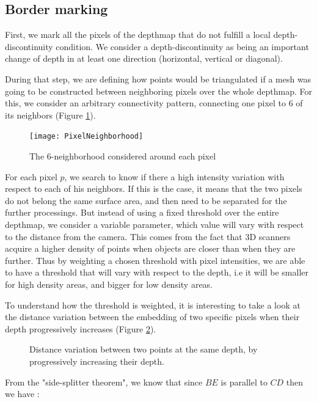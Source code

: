 \documentclass[11pt,fleqn]{book} %
\begin{document}
\subsection{Border marking}
First, we mark all the pixels of the depthmap that do not fulfill a local depth-discontinuity condition. We consider a depth-discontinuity as being an important change of depth in at least one direction (horizontal, vertical or diagonal).

During that step, we are defining how points would be triangulated if a mesh was going to be constructed between neighboring pixels over the whole depthmap. 
For this, we consider an arbitrary connectivity pattern, connecting one pixel to 6 of its neighbors (Figure \ref{fig:pixel_neighborhood}). 

\begin{figure}[ht]
\centering\texttt{[image: PixelNeighborhood]}
\caption{The 6-neighborhood considered around each pixel}
\label{fig:pixel_neighborhood}
\end{figure}

For each pixel $p$, we search to know if there a high intensity variation with respect to each of his neighbors. If this is the case, it means that the two pixels do not belong the same surface area, and then need to be separated for the further processings.
But instead of using a fixed threshold over the entire depthmap, we consider a variable parameter, which value will vary with respect to the distance from the camera.
This comes from the fact that 3D scanners acquire a higher density of points when objects are closer than when they are further. 
Thus by weighting a chosen threshold with pixel intensities, we are able to have a threshold that will vary with respect to the depth, i.e it will be smaller for high density areas, and bigger for low density areas.

To understand how the threshold is weighted, it is interesting to take a look at the distance variation between the embedding of two specific pixels when their depth progressively increases (Figure \ref{fig:distance_depth_variation}).

\begin{figure}[ht]
  \centering
  \def\svgwidth{200pt}
  
  \caption{Distance variation between two points at the same depth, by progressively increasing their depth.}
  \label{fig:distance_depth_variation}
\end{figure}

 From the "side-splitter theorem", we know that since $BE$ is parallel to $CD$ then we have :
\end{document}
